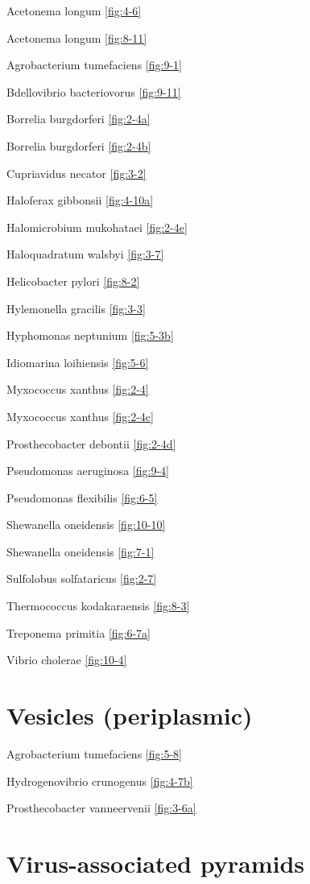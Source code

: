 \documentclass[]{tufte-book}
\begin{document}
Acetonema longum \ref{fig:4-6}

Acetonema longum \ref{fig:8-11}

Agrobacterium tumefaciens \ref{fig:9-1}

Bdellovibrio bacteriovorus \ref{fig:9-11}

Borrelia burgdorferi \ref{fig:2-4a}

Borrelia burgdorferi \ref{fig:2-4b}

Cupriavidus necator \ref{fig:3-2}

Haloferax gibbonsii \ref{fig:4-10a}

Halomicrobium mukohataei \ref{fig:2-4e}

Haloquadratum walsbyi \ref{fig:3-7}

Helicobacter pylori \ref{fig:8-2}

Hylemonella gracilis \ref{fig:3-3}

Hyphomonas neptunium \ref{fig:5-3b}

Idiomarina loihiensis \ref{fig:5-6}

Myxococcus xanthus \ref{fig:2-4}

Myxococcus xanthus \ref{fig:2-4c}

Prosthecobacter debontii \ref{fig:2-4d}

Pseudomonas aeruginosa \ref{fig:9-4}

Pseudomonas flexibilis \ref{fig:6-5}

Shewanella oneidensis \ref{fig:10-10}

Shewanella oneidensis \ref{fig:7-1}

Sulfolobus solfataricus \ref{fig:2-7}

Thermococcus kodakaraensis \ref{fig:8-3}

Treponema primitia \ref{fig:6-7a}

Vibrio cholerae \ref{fig:10-4}

\hypertarget{vesicles-periplasmic}{%
\section*{Vesicles (periplasmic)}\label{vesicles-periplasmic}}

Agrobacterium tumefaciens \ref{fig:5-8}

Hydrogenovibrio crunogenus \ref{fig:4-7b}

Prosthecobacter vanneervenii \ref{fig:3-6a}

\hypertarget{virus-associated-pyramids-1}{%
\section*{Virus-associated pyramids}\label{virus-associated-pyramids-1}}
\end{document}
